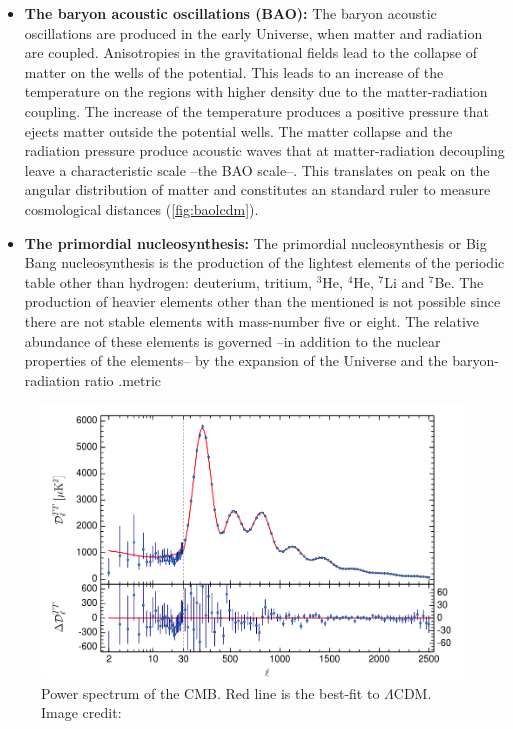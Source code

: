 \begin{itemize}
\item {\bf The baryon acoustic oscillations (BAO):} The baryon acoustic oscillations are produced in the early Universe, when matter and radiation are coupled. Anisotropies in the gravitational fields lead to the collapse of matter on the wells of the potential. This leads to an increase of the temperature on the regions with higher density due to the matter-radiation coupling. The increase of the temperature produces a positive pressure that ejects matter outside the potential wells. The matter collapse and the radiation pressure produce acoustic waves that at matter-radiation decoupling leave a characteristic scale --the BAO scale--. This translates on peak on the angular distribution of matter and constitutes an standard ruler to measure cosmological distances (\autoref{fig:baolcdm}).

\item {\bf The primordial nucleosynthesis:} The primordial nucleosynthesis or Big Bang nucleosynthesis is the production of the lightest elements of the periodic table other than hydrogen: deuterium, tritium, $^3$He, $^4$He, $^7$Li and $^7$Be. The production of heavier elements other than the mentioned is not possible since there are not stable elements with mass-number five or eight. The relative abundance of these elements is governed --in addition to the nuclear properties of the elements-- by the expansion of the Universe and the baryon-radiation ratio \cite{2006IJMPE..15....1S}.metric
\end{itemize}

\begin{figure}
\includegraphics[width=\textwidth]{./Pictures/CMB_pk.png}
\caption{Power spectrum of the CMB. Red line is the best-fit to $\Lambda$CDM. Image credit: \cite{2015arXiv150201589P}}
\label{fig:cmbpk}
\end{figure}

